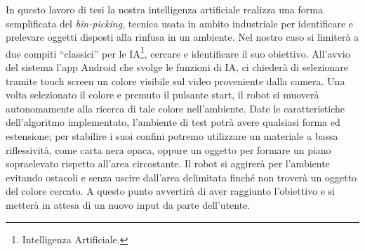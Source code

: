 In questo lavoro di tesi la nostra intelligenza artificiale realizza una forma semplificata del \emph{bin-picking},
tecnica usata in ambito industriale per identificare e prelevare oggetti 
disposti alla rinfusa in un ambiente.\cite{bin-picking} Nel nostro caso si limiterà a due compiti 
``classici'' per le IA\footnote{Intelligenza Artificiale.}, cercare e identificare 
il suo obiettivo. All'avvio del sistema l'app Android che svolge le funzioni di IA,
ci chiederà di selezionare tramite touch screen un colore visibile sul video 
proveniente dalla camera. Una volta selezionato il colore e premuto il pulsante start, 
il robot si muoverà autonomamente alla ricerca di tale colore nell'ambiente. 
Date le caratteristiche dell'algoritmo implementato, l'ambiente di test potrà 
avere qualsiasi forma ed estensione; per stabilire i suoi confini potremo utilizzare 
un materiale a bassa riflessività, come carta nera opaca, oppure un oggetto per 
formare un piano sopraelevato rispetto all'area circostante.
Il robot si aggirerà per l'ambiente evitando ostacoli e senza 
uscire dall'area delimitata finché non troverà un oggetto del colore cercato. 
A questo punto avvertirà di aver raggiunto l'obiettivo e si metterà in attesa di un nuovo 
input da parte dell'utente.